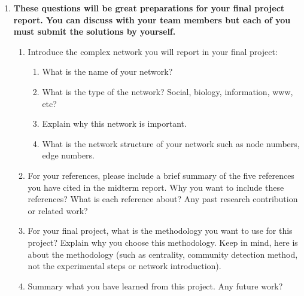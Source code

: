 \documentclass{amsart}
\theoremstyle{definition}
\theoremstyle{remark}
\numberwithin{equation}{section}
\begin{document}
\clearpage
\begin{enumerate}


\item {\bf These questions will be great preparations for your final project report. You can discuss with your team members but each of you must submit the solutions by yourself.}
\begin{enumerate}
\item Introduce the complex network you will report in your final project:
\begin{enumerate}
\item What is the name of your network?
\item What is the type of the network? Social, biology, information, www, etc?
\item Explain why this network is important.
\item What is the network structure of your network such as node numbers, edge numbers. 
\end{enumerate}

\vspace{1cm}

\item 
For your references, please include a brief summary of the five references you have cited in the midterm report. Why you want to include these references? What is each reference about? Any past research contribution or related work?
\vspace{1cm}

\item For your final project, what is the methodology you want to use for this project? Explain why you choose this methodology. Keep in mind, here is about the methodology (such as centrality, community detection method, not the experimental steps or network introduction). 
\vspace{1cm}
\item Summary what you have learned from this project. Any future work? 
\vspace{1cm}
\end{enumerate}

\clearpage


\end{enumerate}
\end{document}
